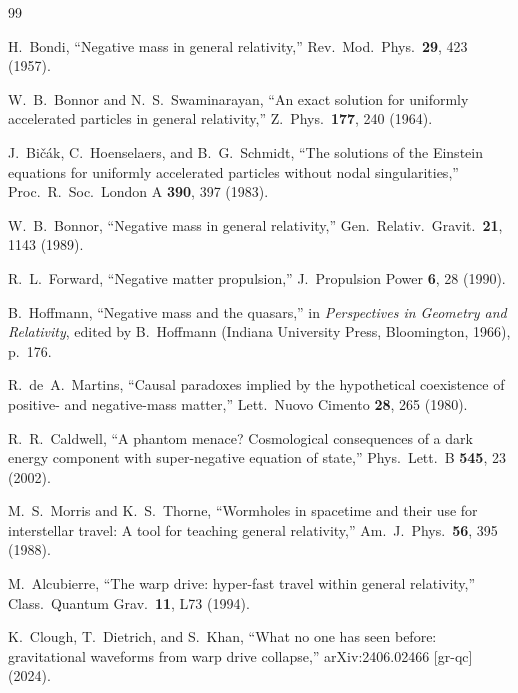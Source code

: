 \documentclass[twocolumn,floatfix,aps,prd,superscriptaddress,nofootinbib]{revtex4-2}
\begin{document}
\begin{thebibliography}{99}

H.~Bondi,
\newblock ``Negative mass in general relativity,''
\newblock Rev.\ Mod.\ Phys.\ \textbf{29}, 423 (1957).

W.~B.~Bonnor and N.~S.~Swaminarayan,
\newblock ``An exact solution for uniformly accelerated particles in general relativity,''
\newblock Z.\ Phys.\ \textbf{177}, 240 (1964).

J.~Bi\v{c}\'ak, C.~Hoenselaers, and B.~G.~Schmidt,
\newblock ``The solutions of the Einstein equations for uniformly accelerated particles without nodal singularities,''
\newblock Proc.\ R.\ Soc.\ London A \textbf{390}, 397 (1983).

W.~B.~Bonnor,
\newblock ``Negative mass in general relativity,''
\newblock Gen.\ Relativ.\ Gravit.\ \textbf{21}, 1143 (1989).

R.~L.~Forward,
\newblock ``Negative matter propulsion,''
\newblock J.\ Propulsion Power \textbf{6}, 28 (1990).

B.~Hoffmann,
\newblock ``Negative mass and the quasars,''
\newblock in \emph{Perspectives in Geometry and Relativity}, edited by B.~Hoffmann (Indiana University Press, Bloomington, 1966), p.~176.

R.~de~A.~Martins,
\newblock ``Causal paradoxes implied by the hypothetical coexistence of positive- and negative-mass matter,''
\newblock Lett.\ Nuovo Cimento \textbf{28}, 265 (1980).

R.~R.~Caldwell,
\newblock ``A phantom menace? Cosmological consequences of a dark energy component with super-negative equation of state,''
\newblock Phys.\ Lett.\ B \textbf{545}, 23 (2002).

M.~S.~Morris and K.~S.~Thorne,
\newblock ``Wormholes in spacetime and their use for interstellar travel: A tool for teaching general relativity,''
\newblock Am.\ J.\ Phys.\ \textbf{56}, 395 (1988).

M.~Alcubierre,
\newblock ``The warp drive: hyper-fast travel within general relativity,''
\newblock Class.\ Quantum Grav.\ \textbf{11}, L73 (1994).

K.~Clough, T.~Dietrich, and S.~Khan,
\newblock ``What no one has seen before: gravitational waveforms from warp drive collapse,''
\newblock arXiv:2406.02466 [gr-qc] (2024).


\end{thebibliography}
\end{document}
